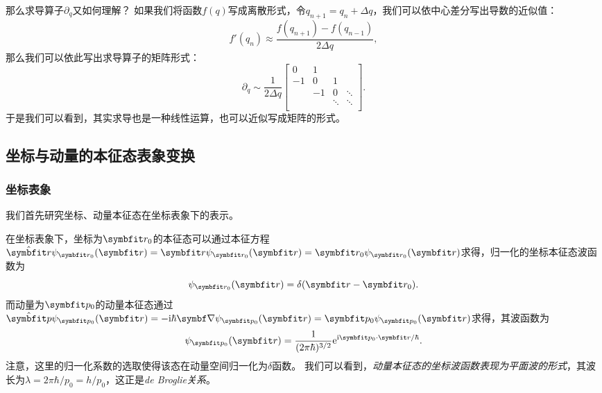 \begin{tcolorbox}[breakable, colframe=purple, colback=red!10, title={\textbf{关于连续力学量的算符}}]
那么求导算子$\partial_q$又如何理解？
如果我们将函数$f(q)$写成离散形式，令$q_{n+1} = q_n + \Delta q$，我们可以依中心差分写出导数的近似值：
\begin{equation}
    f'(q_n) \approx \frac{f(q_{n+1})-f(q_{n-1})}{2\Delta q},
\end{equation}
那么我们可以依此写出求导算子的矩阵形式：
\begin{equation}
    \partial_q \sim \frac{1}{2\Delta q}
    \begin{bmatrix}
        0  &  1 \\
        -1 &  0 &  1    \\
           & -1 &  0    &\ddots \\
           &    &\ddots &\ddots \\
    \end{bmatrix}.
\end{equation}
于是我们可以看到，其实求导也是一种线性运算，也可以近似写成矩阵的形式。
\end{tcolorbox}


\subsection{\texorpdfstring{坐标与动量的本征态\quad 表象变换}{坐标与动量的本征态  表象变换}}
\label{subsec:cmr_eigen_rep_trans}

\subsubsection{坐标表象}

我们首先研究坐标、动量本征态在坐标表象下的表示。

\begin{tcolorbox}
在坐标表象下，坐标为$\rr_0$的本征态可以通过本征方程$\hat{\rr}\psi_{\rr_0}(\rr) = \rr\psi_{\rr_0}(\rr) = \rr_0 \psi_{\rr_0}(\rr)$求得，归一化的坐标本征态波函数为
\begin{equation}
    \psi_{\rr_0}(\rr) = \delta(\rr-\rr_0).
\end{equation}
而动量为$\pp_0$的动量本征态通过$\hat{\pp}\psi_{\pp_0}(\rr) = -\ii\hbar\del\psi_{\pp_0}(\rr) = \pp_0 \psi_{\pp_0}(\rr)$求得，其波函数为
\begin{equation}
    \psi_{\pp_0}(\rr) = \frac{1}{(2\pi\hbar)^{3/2}} \ee^{\ii\pp_0\cdot\rr/\hbar}.
\end{equation}
注意，这里的归一化系数的选取使得该态在动量空间归一化为$\delta$函数。
我们可以看到，\emph{动量本征态的坐标波函数表现为平面波的形式}，其波长为$\lambda=2\pi\hbar/p_0=h/p_0$，这正是\emph{de Broglie关系}。
\end{tcolorbox}

